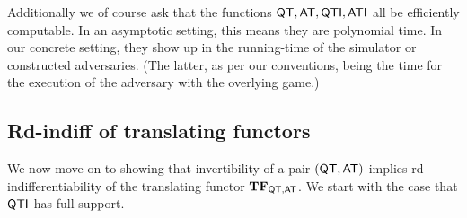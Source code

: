 %




Additionally we of course ask that the functions $\mathsf{QT},\mathsf{AT},\mathsf{QTI},\mathsf{ATI}$ all be efficiently computable. In an asymptotic setting, this means they are polynomial time. In our concrete setting, they show up in the running-time of the simulator or constructed adversaries. (The latter, as per our conventions, being the time for the execution  of the adversary with the overlying game.) 

\subsection{Rd-indiff of translating functors} 

We now move on to showing that invertibility of a pair $(\mathsf{QT},\mathsf{AT})$ implies rd-indifferentiability of the translating functor $\mathbf{TF}_{\mathsf{QT},\mathsf{AT}}$.
We start with the case that $\mathsf{QTI}$ has full support.


